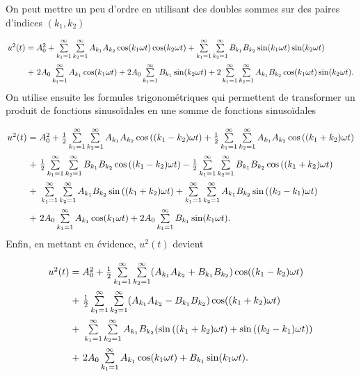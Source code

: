 On peut mettre un peu d'ordre en utilisant des doubles
sommes sur des paires d'indices $(k_1,k_2)$
\[\arraycolsep=1.4pt\def\arraystretch{2.2}
	\begin{array}{cl}
		 u^2(t)	&= A_0^2 + \sum\limits_{k_1=1}^\infty\sum\limits_{k_2=1}^\infty A_{k_1}A_{k_2}\cos(k_1\omega t)\cos(k_2\omega t) 
							+ \sum\limits_{k_1=1}^\infty\sum\limits_{k_2=1}^\infty B_{k_1}B_{k_2}\sin(k_1\omega t)\sin(k_2\omega t)\\ 
						&+~ 2A_0\sum\limits_{k_1=1}^\infty A_{k_1}\cos(k_1\omega t) + 2A_0\sum\limits_{k_1=1}^\infty B_{k_1}\sin(k_2\omega t)
						+ 2\sum\limits_{k_1=1}^\infty\sum\limits_{k_2=1}^\infty A_{k_1}B_{k_2}\cos(k_1\omega t)\sin(k_2\omega t). 
	\end{array}
\]
On utilise ensuite les formules trigonométriques qui
permettent de transformer un produit de fonctions
sinusoïdales en une somme de fonctions sinusoïdales
\[\arraycolsep=1.4pt\def\arraystretch{2.2}
	\begin{array}{cl}
		 u^2(t)	&= A_0^2 + \frac{1}{2}\sum\limits_{k_1=1}^\infty\sum\limits_{k_2=1}^\infty A_{k_1}A_{k_2}\cos\left((k_1-k_2)\omega t\right) 
						+ \frac{1}{2}\sum\limits_{k_1=1}^\infty\sum\limits_{k_2=1}^\infty A_{k_1}A_{k_2}\cos\left((k_1+k_2)\omega t\right)\\ 
						&+~ \frac{1}{2}\sum\limits_{k_1=1}^\infty\sum\limits_{k_2=1}^\infty B_{k_1}B_{k_2}\cos\left((k_1-k_2)\omega t\right)
						- \frac{1}{2}\sum\limits_{k_1=1}^\infty\sum\limits_{k_2=1}^\infty B_{k_1}B_{k_2}\cos\left((k_1+k_2)\omega t\right)\\
						&+~ \sum\limits_{k_1=1}^\infty\sum\limits_{k_2=1}^\infty A_{k_1}B_{k_2}\sin\left((k_1+k_2)\omega t\right)
						+ \sum\limits_{k_1=1}^\infty\sum\limits_{k_2=1}^\infty A_{k_1}B_{k_2}\sin\left((k_2-k_1)\omega t\right)\\
						&+~ 2A_0\sum\limits_{k_1=1}^\infty A_{k_1}\cos(k_1\omega t) + 2A_0\sum\limits_{k_1=1}^\infty B_{k_1}\sin(k_1\omega t).
	\end{array}
\]
Enfin, en mettant en évidence, $u^2(t)$ devient
\[\arraycolsep=1.4pt\def\arraystretch{2.2}
	\begin{array}{cl}
		 u^2(t)	&= A^2_0 + \frac{1}{2}\sum\limits_{k_1=1}^\infty\sum\limits_{k_2=1}^\infty (A_{k_1}A_{k_2}+B_{k_1}B_{k_2})\cos((k_1-k_2)\omega t) \\
						&+~ \frac{1}{2}\sum\limits_{k_1=1}^\infty\sum\limits_{k_2=1}^\infty (A_{k_1}A_{k_2}-B_{k_1}B_{k_2})\cos((k_1+k_2)\omega t) \\
						&+~ \sum\limits_{k_1=1}^\infty\sum\limits_{k_2=1}^\infty A_{k_1}B_{k_2}(\sin\left((k_1+k_2)\omega t\right)
						+\sin\left((k_2-k_1)\omega t\right))\\
						&+~ 2A_0\sum\limits_{k_1=1}^\infty A_{k_1}\cos(k_1\omega t) + B_{k_1}\sin(k_1\omega t).
	\end{array}
\]
